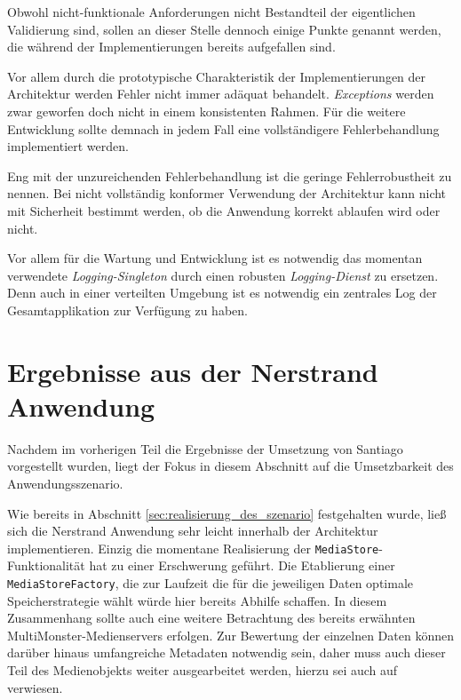  Obwohl nicht-funktionale Anforderungen nicht Bestandteil der eigentlichen Validierung sind, sollen an dieser Stelle dennoch einige Punkte genannt werden, die während der Implementierungen bereits aufgefallen sind.
  
  Vor allem durch die prototypische Charakteristik der Implementierungen der Architektur werden Fehler nicht immer adäquat behandelt. \emph{Exceptions} werden zwar geworfen doch nicht in einem konsistenten Rahmen. Für die weitere Entwicklung sollte demnach in jedem Fall eine vollständigere Fehlerbehandlung implementiert werden.

  Eng mit der unzureichenden Fehlerbehandlung ist die geringe Fehlerrobustheit zu nennen. Bei nicht vollständig konformer Verwendung der Architektur kann nicht mit Sicherheit bestimmt werden, ob die Anwendung korrekt ablaufen wird oder nicht.

  Vor allem für die Wartung und Entwicklung ist es notwendig das momentan verwendete \emph{Logging-Singleton} durch einen robusten \emph{Logging-Dienst} zu ersetzen. Denn auch in einer verteilten Umgebung ist es notwendig ein zentrales Log der Gesamtapplikation zur Verfügung zu haben.



\section{Ergebnisse aus der Nerstrand Anwendung} %
\label{sec:ergebnisse_aus_der_nerstrand_anwendung}

  Nachdem im vorherigen Teil die Ergebnisse der Umsetzung von Santiago vorgestellt wurden, liegt der Fokus in diesem Abschnitt auf die Umsetzbarkeit des Anwendungsszenario.
  
  Wie bereits in Abschnitt \ref{sec:realisierung_des_szenario} festgehalten wurde, ließ sich die Nerstrand Anwendung sehr leicht innerhalb der Architektur implementieren. Einzig die momentane Realisierung der \verb!MediaStore!-Funktionalität hat zu einer Erschwerung geführt. Die Etablierung einer \verb!MediaStoreFactory!, die zur Laufzeit die für die jeweiligen Daten optimale Speicherstrategie wählt würde hier bereits Abhilfe schaffen. In diesem Zusammenhang sollte auch eine weitere Betrachtung des bereits erwähnten MultiMonster-Medienservers erfolgen. Zur Bewertung der einzelnen Daten können darüber hinaus umfangreiche Metadaten notwendig sein, daher muss auch dieser Teil des Medienobjekts weiter ausgearbeitet werden, hierzu sei auch auf \citep{lehmann09} verwiesen.
  
